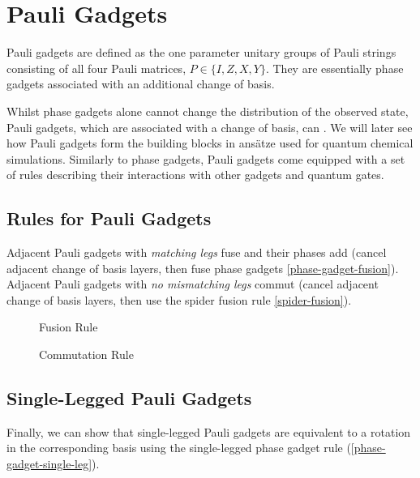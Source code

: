 \section{Pauli Gadgets}

Pauli gadgets are defined as the one parameter unitary groups of Pauli strings consisting of all four Pauli matrices, $P \in \{I, Z, X, Y\}$. They are essentially phase gadgets associated with an additional change of basis.


Whilst phase gadgets alone cannot change the distribution of the observed state, Pauli gadgets, which are associated with a change of basis, can \cite{Yeung2020}. We will later see how Pauli gadgets form the building blocks in ansätze used for quantum chemical simulations. Similarly to phase gadgets, Pauli gadgets come equipped with a set of rules describing their interactions with other gadgets and quantum gates.


\subsection{Rules for Pauli Gadgets}%

Adjacent Pauli gadgets with \textit{matching legs} fuse and their phases add (cancel adjacent change of basis layers, then fuse phase gadgets \ref{phase-gadget-fusion}). Adjacent Pauli gadgets with \textit{no mismatching legs} commut (cancel adjacent change of basis layers, then use the spider fusion rule \ref{spider-fusion}).

\begin{figure}[H]
    \begin{minipage}{0.49\textwidth}
        \centering
        \caption{Fusion Rule}
        \label{pauli-gadget-fusion}
    \end{minipage}
    \hfill
    \begin{minipage}{0.49\textwidth}
        \centering
        \caption{Commutation Rule}
        \label{pauli-gadget-commutation}
    \end{minipage}
\end{figure}


\subsection{Single-Legged Pauli Gadgets}%
\label{pauli-gadget-single-leg}

Finally, we can show that single-legged Pauli gadgets are equivalent to a rotation in the corresponding basis using the single-legged phase gadget rule (\ref{phase-gadget-single-leg}).

